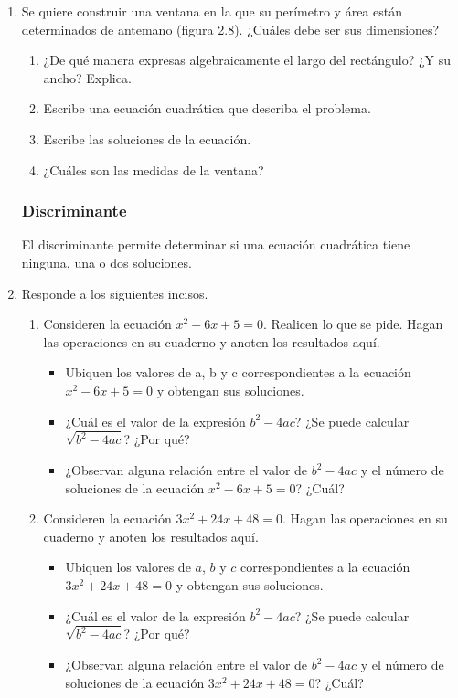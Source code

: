 \begin{enumerate}
    \item Se quiere construir una ventana en la que su perímetro y área
          están determinados de antemano (figura 2.8). ¿Cuáles debe ser sus dimensiones?
          \begin{enumerate}
              \item ¿De qué manera expresas algebraicamente el largo del rectángulo? ¿Y su ancho? Explica.
              \item Escribe una ecuación cuadrática que describa el problema.
              \item Escribe las soluciones de la ecuación.
              \item ¿Cuáles son las medidas de la ventana?
          \end{enumerate}

          \newpage

          \subsubsection{Discriminante}
          El discriminante permite determinar si una ecuación cuadrática tiene ninguna, una o
          dos soluciones.

    \item Responde a los siguientes incisos.
          \begin{enumerate}
              \item Consideren la ecuación $x^2 - 6x + 5 = 0$. Realicen lo que se pide. Hagan las operaciones en su cuaderno y anoten los resultados aquí.
                    \begin{itemize}
                        \item Ubiquen los valores de a, b y c correspondientes a la ecuación $x^2 - 6x + 5 = 0$ y obtengan sus soluciones.
                        \item ¿Cuál es el valor de la expresión $b^2 - 4ac$? ¿Se puede calcular $\sqrt{b^2 - 4ac}$? ¿Por qué?
                        \item ¿Observan alguna relación entre el valor de $b^2 - 4ac$ y el número de soluciones de la ecuación $x^2 - 6x + 5 = 0$? ¿Cuál?
                    \end{itemize}

              \item Consideren la ecuación $3x^2 + 24x + 48 = 0$. Hagan las operaciones en su cuaderno y anoten los resultados aquí.
                    \begin{itemize}
                        \item Ubiquen los valores de $a$, $b$ y $c$ correspondientes a la ecuación $3x^2 + 24x + 48 = 0$ y obtengan sus soluciones.
                        \item ¿Cuál es el valor de la expresión $b^2 - 4ac$? ¿Se puede calcular $\sqrt{b^2 - 4ac}$? ¿Por qué?
                        \item ¿Observan alguna relación entre el valor de $b^2 - 4ac$ y el número de soluciones de la ecuación $3x^2 + 24x + 48 = 0$? ¿Cuál?
                    \end{itemize}


\end{enumerate}
\end{enumerate}
